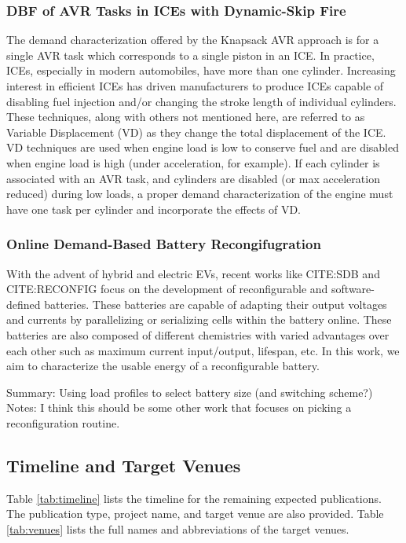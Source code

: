 \subsubsection{DBF of AVR Tasks in ICEs with Dynamic-Skip Fire}

The demand characterization offered by the Knapsack AVR approach is for a single AVR task which corresponds to a single piston in an ICE.
In practice, ICEs, especially in modern automobiles, have more than one cylinder.
Increasing interest in efficient ICEs has driven manufacturers to produce ICEs capable of disabling fuel injection and/or changing the stroke length of individual cylinders.
These techniques, along with others not mentioned here, are referred to as Variable Displacement (VD) as they change the total displacement of the ICE.
VD techniques are used when engine load is low to conserve fuel and are disabled when engine load is high (under acceleration, for example).
If each cylinder is associated with an AVR task, and cylinders are disabled (or max acceleration reduced) during low loads, a proper demand characterization of the engine must have one task per cylinder and incorporate the effects of VD.

\subsubsection{Online Demand-Based Battery Recongifugration}

With the advent of hybrid and electric EVs, recent works like CITE:SDB and CITE:RECONFIG focus on the development of reconfigurable and software-defined batteries.
These batteries are capable of adapting their output voltages and currents by parallelizing or serializing cells within the battery online.
These batteries are also composed of different chemistries with varied advantages over each other such as maximum current input/output, lifespan, etc.
In this work, we aim to characterize the usable energy of a reconfigurable battery.

Summary: Using load profiles to select battery size (and switching scheme?)
Notes: I think this should be some other work that focuses on picking a reconfiguration routine.

\subsection{Timeline and Target Venues}

Table \ref{tab:timeline} lists the timeline for the remaining expected publications.
The publication type, project name, and target venue are also provided.
Table \ref{tab:venues} lists the full names and abbreviations of the target venues.


